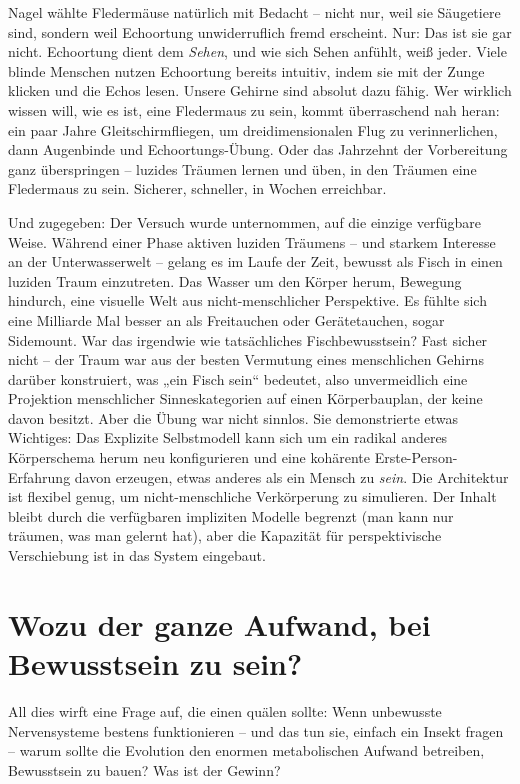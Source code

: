 \documentclass[11pt, twoside, openright]{book}
\begin{document}
Nagel wählte Fledermäuse natürlich mit Bedacht -- nicht nur, weil sie Säugetiere sind, sondern weil Echoortung unwiderruflich fremd erscheint. Nur: Das ist sie gar nicht. Echoortung dient dem \textit{Sehen}, und wie sich Sehen anfühlt, weiß jeder. Viele blinde Menschen nutzen Echoortung bereits intuitiv, indem sie mit der Zunge klicken und die Echos lesen. Unsere Gehirne sind absolut dazu fähig. Wer wirklich wissen will, wie es ist, eine Fledermaus zu sein, kommt überraschend nah heran: ein paar Jahre Gleitschirmfliegen, um dreidimensionalen Flug zu verinnerlichen, dann Augenbinde und Echoortungs-Übung. Oder das Jahrzehnt der Vorbereitung ganz überspringen -- luzides Träumen lernen und üben, in den Träumen eine Fledermaus zu sein. Sicherer, schneller, in Wochen erreichbar.

Und zugegeben: Der Versuch wurde unternommen, auf die einzige verfügbare Weise. Während einer Phase aktiven luziden Träumens -- und starkem Interesse an der Unterwasserwelt -- gelang es im Laufe der Zeit, bewusst als Fisch in einen luziden Traum einzutreten. Das Wasser um den Körper herum, Bewegung hindurch, eine visuelle Welt aus nicht-menschlicher Perspektive. Es fühlte sich eine Milliarde Mal besser an als Freitauchen oder Gerätetauchen, sogar Sidemount. War das irgendwie wie tatsächliches Fischbewusstsein? Fast sicher nicht -- der Traum war aus der besten Vermutung eines menschlichen Gehirns darüber konstruiert, was „ein Fisch sein“ bedeutet, also unvermeidlich eine Projektion menschlicher Sinneskategorien auf einen Körperbauplan, der keine davon besitzt. Aber die Übung war nicht sinnlos. Sie demonstrierte etwas Wichtiges: Das Explizite Selbstmodell kann sich um ein radikal anderes Körperschema herum neu konfigurieren und eine kohärente Erste-Person-Erfahrung davon erzeugen, etwas anderes als ein Mensch zu \textit{sein}. Die Architektur ist flexibel genug, um nicht-menschliche Verkörperung zu simulieren. Der Inhalt bleibt durch die verfügbaren impliziten Modelle begrenzt (man kann nur träumen, was man gelernt hat), aber die Kapazität für perspektivische Verschiebung ist in das System eingebaut.

\section*{Wozu der ganze Aufwand, bei Bewusstsein zu sein?}

All dies wirft eine Frage auf, die einen quälen sollte: Wenn unbewusste Nervensysteme bestens funktionieren -- und das tun sie, einfach ein Insekt fragen -- warum sollte die Evolution den enormen metabolischen Aufwand betreiben, Bewusstsein zu bauen? Was ist der Gewinn?
\end{document}
